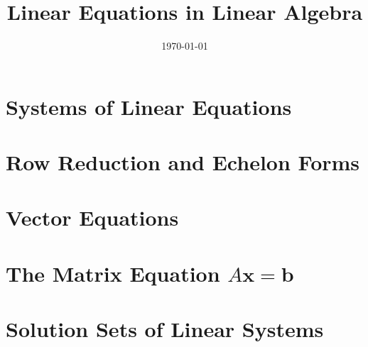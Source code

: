 \documentclass[12pt,a4paper]{article}
\title{Linear Equations in Linear Algebra}
\author{}
\date{\today}
\renewcommand{\vec}[1]{\boldsymbol{#1}}
\begin{document}
\maketitle
\section{Systems of Linear Equations}



















\section{Row Reduction and Echelon Forms}
















\section{Vector Equations}

















\section{The Matrix Equation $A\vec{x} = \vec{b}$}















\section{Solution Sets of Linear Systems}
\end{document}
